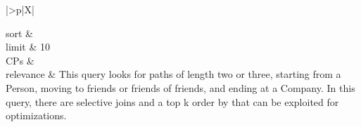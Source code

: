 \begin{tabularx}{\queryCardWidth}{|>{\queryPropertyCell}p{\queryPropertyCellWidth}|X|}
%
	
		sort		&
		\innerCardVSpace \\ \hline
	limit & 10 \\ \hline
	CPs &
	 \\ \hline
	relevance &
		\small This query looks for paths of length two or three, starting from a Person, moving to friends or friends of friends,
and ending at a Company. In this query, there are selective joins and a top k order by that can be exploited for
optimizations.
 \\ \hline%
\end{tabularx}
\queryCardVSpace

\renewcommand{\emph}[1]{\oldemph{#1}}